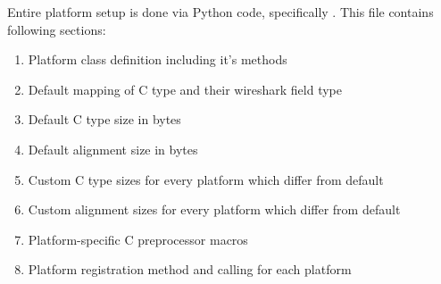 \documentclass[A4paper,10pt,english]{sphinxmanual}
\begin{document}
Entire platform setup is done via Python code, specifically . This file contains following sections:
\begin{enumerate}
\item {} 
Platform class definition including it's methods

\item {} 
Default mapping of C type and their wireshark field type

\item {} 
Default C type size in bytes

\item {} 
Default alignment size in bytes

\item {} 
Custom C type sizes for every platform which differ from default

\item {} 
Custom alignment sizes for every platform which differ from default

\item {} 
Platform-specific C preprocessor macros

\item {} 
Platform registration method and calling for each platform

\end{enumerate}
\end{document}

